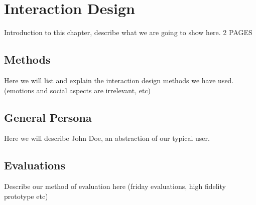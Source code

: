 \chapter{Interaction Design} %

Introduction to this chapter, describe what we are going to show here. 2 PAGES

\section{Methods}
Here we will list and explain the interaction design methods we have used. (emotions and social aspects are irrelevant, etc)

\section{General Persona}
Here we will describe John Doe, an abstraction of our typical user.

\section{Evaluations}
Describe our method of evaluation here (friday evaluations, high fidelity prototype etc)